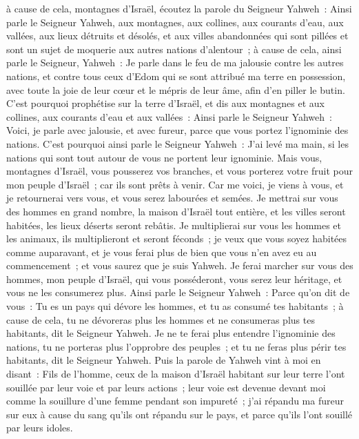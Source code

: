 \begin{multicols}{2}
à cause de cela, montagnes d'Israël, écoutez la parole du Seigneur Yahweh~: Ainsi parle le Seigneur Yahweh, aux montagnes, aux collines, aux courants d'eau, aux vallées, aux lieux détruits et désolés, et aux villes abandonnées qui sont pillées et sont un sujet de moquerie aux autres nations d'alentour~;
à cause de cela, ainsi parle le Seigneur, Yahweh~: Je parle dans le feu de ma jalousie contre les autres nations, et contre tous ceux d'Edom qui se sont attribué ma terre en possession, avec toute la joie de leur cœur et le mépris de leur âme, afin d'en piller le butin.
C'est pourquoi prophétise sur la terre d'Israël, et dis aux montagnes et aux collines, aux courants d'eau et aux vallées~: Ainsi parle le Seigneur Yahweh~: Voici, je parle avec jalousie, et avec fureur, parce que vous portez l'ignominie des nations.
C'est pourquoi ainsi parle le Seigneur Yahweh~: J'ai levé ma main, si les nations qui sont tout autour de vous ne portent leur ignominie.
Mais vous, montagnes d'Israël, vous pousserez vos branches, et vous porterez votre fruit pour mon peuple d'Israël~; car ils sont prêts à venir.
Car me voici, je viens à vous, et je retournerai vers vous, et vous serez labourées et semées.
Je mettrai sur vous des hommes en grand nombre, la maison d'Israël tout entière, et les villes seront habitées, les lieux déserts seront rebâtis.
Je multiplierai sur vous les hommes et les animaux, ils multiplieront et seront féconds~; je veux que vous soyez habitées comme auparavant, et je vous ferai plus de bien que vous n'en avez eu au commencement~; et vous saurez que je suis Yahweh.
Je ferai marcher sur vous des hommes, mon peuple d'Israël, qui vous posséderont, vous serez leur héritage, et vous ne les consumerez plus.
Ainsi parle le Seigneur Yahweh~: Parce qu'on dit de vous~: Tu es un pays qui dévore les hommes, et tu as consumé tes habitants~;
à cause de cela, tu ne dévoreras plus les hommes et ne consumeras plus tes habitants, dit le Seigneur Yahweh.
Je ne te ferai plus entendre l'ignominie des nations, tu ne porteras plus l'opprobre des peuples~; et tu ne feras plus périr tes habitants, dit le Seigneur Yahweh.
Puis la parole de Yahweh vint à moi en disant~:
Fils de l'homme, ceux de la maison d'Israël habitant sur leur terre l'ont souillée par leur voie et par leurs actions~; leur voie est devenue devant moi comme la souillure d'une femme pendant son impureté~;
j'ai répandu ma fureur sur eux à cause du sang qu'ils ont répandu sur le pays, et parce qu'ils l'ont souillé par leurs idoles.

\end{multicols}
